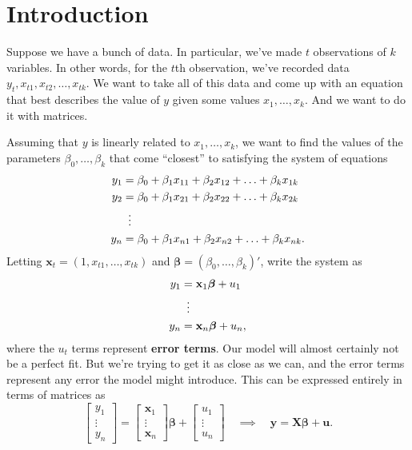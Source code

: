 \documentclass[12pt]{article}
\renewcommand{\vec}[1]{\mathbf{#1}}
\newcommand{\Limplies}{\quad \implies \quad}
\theoremstyle{definition}
\begin{document}
\maketitle
\onehalfspace



\section{Introduction}

Suppose we have a bunch of data. In particular, we've made $t$ observations of $k$ variables. In other words, for the $t$th observation, we've recorded data $y_t, x_{t1}, x_{t2}, \hdots, x_{tk}$. We want to take all of this data and come up with an equation that best describes the value of $y$ given some values $x_1, \hdots, x_k$. And we want to do it with matrices. 

Assuming that $y$ is linearly related to $x_1, \hdots, x_k$, we want to find the values of the parameters $\beta_0, \hdots, \beta_k$ that come ``closest'' to satisfying the system of equations
\begin{align*}
	y_1 &= \beta_0 + \beta_1x_{11} + \beta_2x_{12} + \hdots + \beta_kx_{1k} \\
	y_2 &= \beta_0 + \beta_1x_{21} + \beta_2x_{22} + \hdots + \beta_kx_{2k} \\
	&\mathrel{\makebox[\widthof{=}]{\vdots}} \\
	y_n &= \beta_0 + \beta_1x_{n1} + \beta_2x_{n2} + \hdots + \beta_kx_{nk}.
\end{align*}
Letting $\vec{x}_t=(1 , x_{t1}, \hdots, x_{tk})$ and $\bm{\beta} = (\beta_0, \hdots, \beta_k)'$, write the system as 
\begin{align*}
	y_1 &= \vec{x}_1 \bm{\beta} + u_1\\
	&\mathrel{\makebox[\widthof{=}]{\vdots}} \\
	y_n &= \vec{x}_n \bm{\beta} + u_n,
\end{align*}
where the $u_t$ terms represent \textbf{error terms}. Our model will almost certainly not be a perfect fit. But we're trying to get it as close as we can, and the error terms represent any error the model might introduce. This can be expressed entirely in terms of matrices as 
\[
\begin{bmatrix}
	y_1 \\ \vdots \\ y_n
\end{bmatrix} =
\begin{bmatrix}
	\vec{x}_1 \\ \vdots \\ \vec{x}_n
\end{bmatrix}\bm{\beta} + 
\begin{bmatrix}
	u_1 \\ \vdots \\ u_n
\end{bmatrix} \Limplies \vec{y} = \vec{X}\bm{\beta} + \vec{u}.
\]
\end{document}
